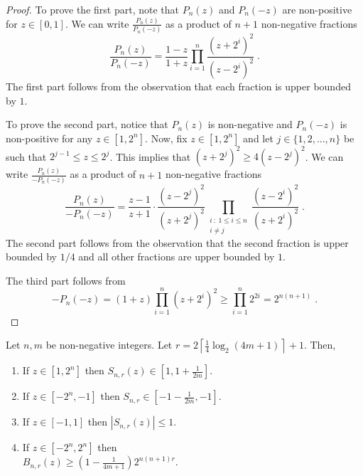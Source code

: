 \begin{proof}
To prove the first part, note that $P_n(z)$ and $P_n(-z)$ are non-positive for
$z \in [0,1]$. We can write $\frac{P_n(z)}{P_n(-z)}$ as a product of $n+1$
non-negative fractions
$$
\frac{P_n(z)}{P_n(-z)} = \frac{1-z}{1+z} \prod_{i=1}^n \frac{(z+2^i)^2}{(z-2^i)^2} \; .
$$
The first part follows from the observation that each fraction is upper bounded
by $1$.

To prove the second part, notice that $P_n(z)$ is non-negative and $P_n(-z)$ is
non-positive for any $z \in [1,2^n]$. Now, fix $z \in [1,2^n]$ and let $j \in
\{1,2,\dots,n\}$ be such that $2^{j-1} \le z \le 2^j$. This implies that
$(z+2^{j})^2 \ge 4 (z - 2^j)^2$. We can write $\frac{P_n(z)}{-P_n(-z)}$ as a
product of $n+1$ non-negative fractions
$$
\frac{P_n(z)}{-P_n(-z)}
= \frac{z-1}{z+1} \cdot \frac{(z-2^j)^2}{(z+2^j)^2} \prod_{\substack{i ~:~ 1 \le i \le n \\ i \neq j}} \frac{(z-2^i)^2}{(z+2^i)^2} \; .
$$
The second part follows from the observation that the second fraction is upper
bounded by $1/4$ and all other fractions are upper bounded by $1$.

The third part follows from
$$
-P_n(-z) = (1+z) \prod_{i=1}^n (z+2^i)^2 \ge \prod_{i=1}^n 2^{2i} = 2^{n(n+1)} \; .
$$
\end{proof}

\begin{lemma}
\label{lemma:properties-of-s-n-r}
Let $n,m$ be non-negative integers.
Let $r = 2 \left\lceil \frac{1}{4} \log_2(4m + 1) \right\rceil + 1$. Then,
\begin{enumerate}
\item If $z \in [1,2^n]$ then $S_{n,r}(z) \in [1,1+\frac{1}{2m}]$.
\item If $z \in [-2^n, -1]$ then $S_{n,r} \in [-1-\frac{1}{2m}, -1]$.
\item If $z \in [-1,1]$ then $|S_{n,r}(z)| \le 1$.
\item If $z \in [-2^n,2^n]$ then \\ $B_{n,r}(z) \ge \left(1 - \frac{1}{4m+1} \right) 2^{n(n+1)r}$.
\end{enumerate}
\end{lemma}

